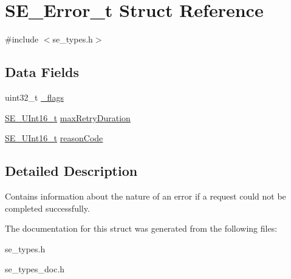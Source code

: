 \hypertarget{structSE__Error__t}{}\section{S\+E\+\_\+\+Error\+\_\+t Struct Reference}
\label{structSE__Error__t}


{\ttfamily \#include $<$se\+\_\+types.\+h$>$}

\subsection*{Data Fields}
\begin{DoxyCompactItemize}
\item 
uint32\+\_\+t \hyperlink{group__Error_ga8aa22215f51b089c7bdb02b69c5fd9eb}{\+\_\+flags}
\item 
\hyperlink{group__UInt16_gac68d541f189538bfd30cfaa712d20d29}{S\+E\+\_\+\+U\+Int16\+\_\+t} \hyperlink{group__Error_ga0e519f8abdfdbf90cb4262b3670c8a87}{max\+Retry\+Duration}
\item 
\hyperlink{group__UInt16_gac68d541f189538bfd30cfaa712d20d29}{S\+E\+\_\+\+U\+Int16\+\_\+t} \hyperlink{group__Error_gac36d2114ba2736c8052d850778818b78}{reason\+Code}
\end{DoxyCompactItemize}


\subsection{Detailed Description}
Contains information about the nature of an error if a request could not be completed successfully. 

The documentation for this struct was generated from the following files\+:\begin{DoxyCompactItemize}
\item 
se\+\_\+types.\+h\item 
se\+\_\+types\+\_\+doc.\+h\end{DoxyCompactItemize}
